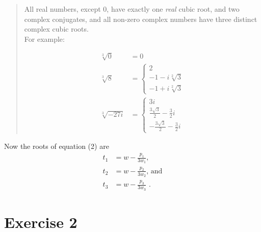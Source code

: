 \documentclass[a4paper,12pt]{article}
\begin{document}
\begin{quote}
All real numbers, except $0$, have exactly one \emph{real} cubic root, and two complex conjugates, and all non-zero complex numbers have three distinct complex cubic roots. \\
For example:

\begin{subequations}
	\begin{align}
	\sqrt[3]{0}&=0 \\
	\sqrt[3]{8}&=\begin{cases}
	                   2\\
                       -1-i\sqrt[2]{3}\\
                       -1+i\sqrt[2]{3}
	             \end{cases}\\
	\sqrt[3]{-27i}&=\begin{cases} 
	                 3i \\
	                  \frac{3\sqrt{3}}{2}-\frac{3}{2}i\\
	                  -\frac{3\sqrt{3}}{2}-\frac{3}{2}i
	                 \end{cases}           
    \end{align}
\end{subequations}
\end{quote}
Now the roots of equation (2) are
\begin{subequations}
	\begin{align}
	t_1&=w-\frac{p_1}{3w_1}\text{,}\\
	t_2&=w-\frac{p_2}{3w_2}\text{, and}\\
	t_3&=w-\frac{p_3}{3w_3}\text{ .}
	\end{align}
\end{subequations}

\section*{Exercise 2}
\bigskip
\end{document}
